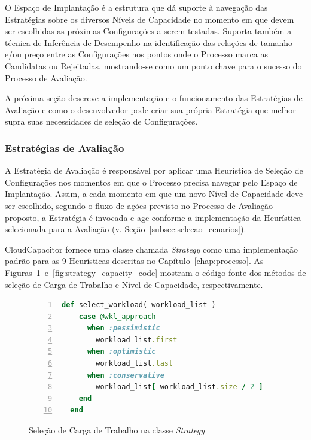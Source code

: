O Espaço de Implantação é a estrutura que dá suporte à navegação das Estratégias
sobre os diversos Níveis de Capacidade no momento em que devem ser escolhidas
as próximas Configurações a serem testadas. Suporta também a técnica de Inferência 
de Desempenho na identificação das relações de tamanho e/ou preço entre as 
Configurações nos pontos onde o Processo marca as Candidatas ou Rejeitadas, 
mostrando-se como um ponto chave para o sucesso do Processo de Avaliação.

A próxima seção descreve a implementação e o funcionamento das Estratégias de 
Avaliação e como o desenvolvedor pode criar sua própria Estratégia que melhor
supra suas necessidades de seleção de Configurações. 

\subsubsection{Estratégias de Avaliação}
\label{subsubsec:funcionamento_estrategias}
A Estratégia de Avaliação é responsável por aplicar uma Heurística de 
Seleção de Configurações nos momentos em que o Processo precisa navegar
pelo Espaço de Implantação. Assim, a cada momento em que um novo Nível 
de Capacidade deve ser escolhido, segundo o fluxo de ações previsto no 
Processo de Avaliação proposto, a Estratégia é invocada e age conforme 
a implementação da Heurística selecionada para a Avaliação 
(v. Seção~\ref{subsec:selecao_cenarios}).

CloudCapacitor fornece uma classe chamada \emph{Strategy} como uma implementação
padrão para as 9 Heurísticas descritas no Capítulo~\ref{chap:processo}. As
Figuras~\ref{fig:strategy_workload_code}~e~\ref{fig:strategy_capacity_code}
mostram o código fonte dos métodos de seleção de Carga de Trabalho e Nível
de Capacidade, respectivamente.

\begin{figure}[h]
  \begin{lstlisting}[language=Ruby,linewidth=\textwidth,xleftmargin=.04\textwidth, numbers=left]
  def select_workload( workload_list )
    case @wkl_approach
      when :pessimistic
        workload_list.first
      when :optimistic
        workload_list.last
      when :conservative
        workload_list[ workload_list.size / 2 ]
    end
  end
  \end{lstlisting}
  \caption{\label{fig:strategy_workload_code}Seleção de Carga de Trabalho na classe \emph{Strategy}}
\end{figure}


